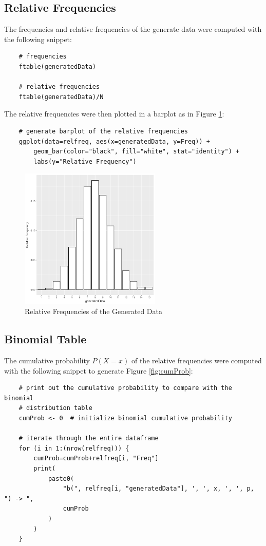 \documentclass{article}
\begin{document}
        \subsection{Relative Frequencies}
            The frequencies and relative frequencies of the generate data were computed with the following snippet:
\begin{lstlisting}
    # frequencies
    ftable(generatedData)

    # relative frequencies
    ftable(generatedData)/N
\end{lstlisting}

            The relative frequencies were then plotted in a barplot as in Figure \ref{fig:relfreq}:
\begin{lstlisting}
    # generate barplot of the relative frequencies
    ggplot(data=relfreq, aes(x=generatedData, y=Freq)) + 
        geom_bar(color="black", fill="white", stat="identity") +
        labs(y="Relative Frequency")
\end{lstlisting}

            \begin{figure}[h]
                \begin{center}
                    \includegraphics[width=0.6\textwidth]{figures/relfreq.png}
                    \caption{Relative Frequencies of the Generated Data} \label{fig:relfreq}
                \end{center}
            \end{figure}

        \subsection{Binomial Table}
            The cumulative probability $P(X=x)$ of the relative frequencies were computed with the following snippet to generate Figure \ref{fig:cumProb}:
\begin{lstlisting}
    # print out the cumulative probability to compare with the binomial 
    # distribution table
    cumProb <- 0  # initialize binomial cumulative probability

    # iterate through the entire dataframe
    for (i in 1:(nrow(relfreq))) {
        cumProb=cumProb+relfreq[i, "Freq"]
        print(
            paste0(
                "b(", relfreq[i, "generatedData"], ', ', x, ', ', p, ") -> ",
                cumProb
            )
        )
    }
\end{lstlisting}
\end{document}
